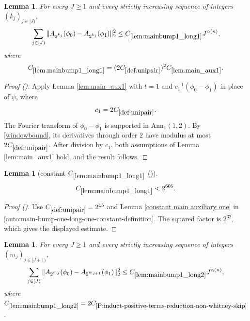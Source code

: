 \documentclass[12pt,reqno]{amsart}
\newcommand{\auto}{{({\tiny\faCar})}}
\theoremstyle{plain}
\newtheorem{lemma}[theorem]{Lemma}
\numberwithin{equation}{section}
\theoremstyle{remark}
\newcommand{\uses}[1]{}
\newcommand{\usesdefs}[1]{}
\begin{document}
\begin{lemma}\label{lem:mainbump1_long1}\uses{lem:main_aux1}\usesdefs{A_def,def:cn-window,def:unipair}
For every $J\ge1$ and every strictly increasing sequence of integers $(k_j)_{j\in[J)}$,
\begin{equation}\label{mainbump1_long1}
\sum_{j\in[J)}\|A_{2^{k_j}}(\phi_0)-A_{2^{k_j}}(\phi_1)\|_2^2
\le C_{\ref{lem:mainbump1_long1}}J^{\alpha(n)},
\end{equation}
where
\begin{equation}\label{auto:main-bump-one-long-one-constant-definition}
C_{\ref{lem:mainbump1_long1}}
=(2C_{\ref{def:unipair}})^2C_{\ref{lem:main_aux1}}.
\end{equation}
\end{lemma}

\begin{proof}[Proof \auto]
Apply Lemma \ref{lem:main_aux1} with $t=1$ and $c_1^{-1}(\phi_0-\phi_1)$ in place of $\psi$, where
\[
c_1=2C_{\ref{def:unipair}}.
\]
The Fourier transform of $\phi_0-\phi_1$ is supported in $\mathrm{Ann}_1(1,2)$. By \eqref{windowbound}, its derivatives through order $2$ have modulus at most $2C_{\ref{def:unipair}}$. After division by $c_1$, both assumptions of Lemma \ref{lem:main_aux1} hold, and the result follows.
\end{proof}

\begin{lemma}[constant $C_{\ref{lem:mainbump1_long1}}$ \auto]\label{constant main bump one long one}\uses{constant main auxiliary one,lem:mainbump1_long1}\usesdefs{def:unipair}
\begin{equation}\label{constant main bump one long one bound}
C_{\ref{lem:mainbump1_long1}}<2^{605}.
\end{equation}
\end{lemma}
\begin{proof}[Proof \auto]
Use $C_{\ref{def:unipair}}=2^{15}$ and Lemma \ref{constant main auxiliary one} in \eqref{auto:main-bump-one-long-one-constant-definition}. The squared factor is $2^{32}$, which gives the displayed estimate.
\end{proof}

\begin{lemma}\label{lem:mainbump1_long2}\uses{Extension of sequences,A to Lambda,P:induct-positive-terms-reduction-non-whitney-skip,Operations on spaced sequences}\usesdefs{A_def,normalized function tuples,auto:prism-form-definition,multiplicatively spaced monotone sequences,def:unipair}
For every $J\ge 1$ and every strictly increasing sequence of integers $(m_j)_{j\in[J+1)}$,
\begin{equation}\label{mainbump1_long2}
\sum_{j\in[J)} \|
A_{2^{m_{j}}}(\phi_0)-A_{2^{m_{j+1}}}(\phi_1) \|_{2}^2  \le C_{\ref{lem:mainbump1_long2}} J^{\alpha(n)},\end{equation}
where $C_{\ref{lem:mainbump1_long2}}=2 C_{\ref{P:induct-positive-terms-reduction-non-whitney-skip}}$.
\end{lemma}
\end{document}
